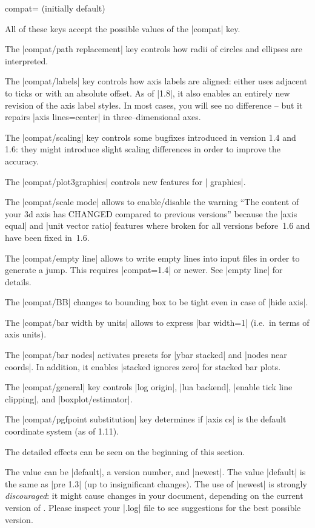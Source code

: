 \begin{pgfplotskey}{compat= (initially default)}
\begin{pgfplotskeylist}
	All of these keys accept the possible values of the |compat| key.

	The |compat/path replacement| key controls how radii of circles and ellipses are interpreted.

	The |compat/labels| key controls how axis labels are aligned: either uses adjacent to ticks or with an absolute offset. As of |1.8|, it also enables an entirely new revision of the axis label styles. In most cases, you will see no difference -- but it repairs |axis lines=center| in three--dimensional axes.

	The |compat/scaling| key controls some bugfixes introduced in version 1.4 and 1.6: they might introduce slight scaling differences in order to improve the accuracy.

	The |compat/plot3graphics| controls new features for | graphics|.

	The |compat/scale mode| allows to enable/disable the warning ``The content of your 3d axis has CHANGED compared to previous versions'' because the |axis equal| and |unit vector ratio| features where broken for all versions before~1.6 and have been fixed in~1.6.

	The |compat/empty line| allows to write empty lines into input files in order to generate a jump. This requires |compat=1.4| or newer. See |empty line| for details.

	The |compat/BB| changes to bounding box to be tight even in case of |hide axis|.

	The |compat/bar width by units| allows to express |bar width=1| (i.e.\ in terms of axis units).

	The |compat/bar nodes| activates presets for |ybar stacked| and |nodes near coords|. In addition, it enables |stacked ignores zero| for stacked bar plots.

	The |compat/general| key controls |log origin|, |lua backend|, |enable tick line clipping|, and |boxplot/estimator|.

	The |compat/pgfpoint substitution| key determines if |axis cs| is the default coordinate system (as of 1.11).

	The detailed effects can be seen on the beginning of this section.
	\end{pgfplotskeylist}

	The value  can be |default|, a version number, and |newest|. The value |default| is the same as |pre 1.3| (up to insignificant changes). The use of |newest| is strongly \emph{discouraged}: it might cause changes in your document, depending on the current version of \PGFPlots. Please inspect your |.log| file to see suggestions for the best possible version. 
\end{pgfplotskey}

